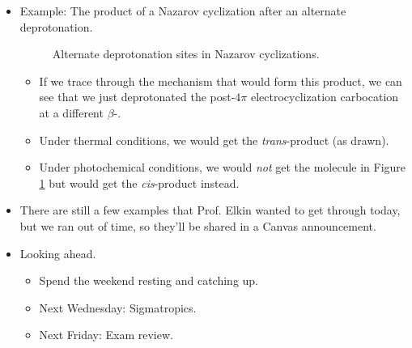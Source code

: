 \documentclass[../notes.tex]{subfiles}
\begin{document}
\begin{itemize}
\begin{itemize}
        \begin{itemize}
            \item If we just see acid/reagents and no triangle, assume thermal.
            \item If we see $h\nu$, \emph{then} we consider the photochemical pathway.
        \end{itemize}
        \item There are 5 atoms and 4 electrons in the $\pi$-system, so per the three rules from Lecture 12, there will be five MOs and the lowest two will be filled.
        \begin{itemize}
            \item Thus, the HOMO is the 2nd energy level, so it will have 1 (symmetric) node.
            \item Because this is an odd number of atoms, the middle $p$-orbital gets deleted!
        \end{itemize}
        \item As we have drawn our HOMO, a conrotatory pathway will unite lobes with like shadings.
        \item This yields the \emph{trans}-product.
    \end{itemize}
    \item Example: The product of a Nazarov cyclization after an alternate deprotonation.
    \begin{figure}[h!]
        \centering
        \footnotesize
        \caption{Alternate deprotonation sites in Nazarov cyclizations.}
        \label{fig:nazarovAltDeprot}
    \end{figure}
    \begin{itemize}
        \item If we trace through the mechanism that would form this product, we can see that we just deprotonated the post-$4\pi$ electrocyclization carbocation at a different $\beta$-.
        \item Under thermal conditions, we would get the \emph{trans}-product (as drawn).
        \item Under photochemical conditions, we would \emph{not} get the molecule in Figure \ref{fig:nazarovAltDeprot} but would get the \emph{cis}-product instead.
    \end{itemize}
    \item There are still a few examples that Prof. Elkin wanted to get through today, but we ran out of time, so they'll be shared in a Canvas announcement.
    \item Looking ahead.
    \begin{itemize}
        \item Spend the weekend resting and catching up.
        \item Next Wednesday: Sigmatropics.
        \item Next Friday: Exam review.
    \end{itemize}
\end{itemize}
\end{document}
